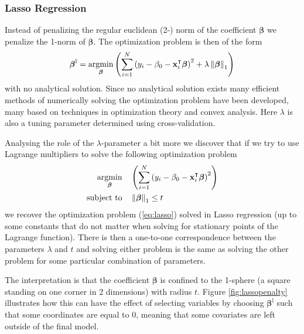 \documentclass[a4paper, 12pt]{scrartcl}
\newcommand{\bfbeta}{\boldsymbol{\beta}}
\newcommand{\bfx}{\mathbf{x}}
\begin{document}

\subsubsection*{Lasso Regression}
\begin{algorithm}
Instead of penalizing the regular euclidean (2-) norm of the coefficient $\bfbeta$ we penalize the 1-norm of $\bfbeta$.
The optimization problem is then of the form
\begin{equation}\label{eq:lasso}
	\bfbeta^\mathrm{l}=\operatornamewithlimits{argmin}_{\bfbeta}\left(\sum_{i=1}^{N}\left(y_i-\beta_0-\bfx_i^\intercal\bfbeta\right)^2+\lambda\left\|\bfbeta\right\|_1\right)
\end{equation}
with no analytical solution.
Since no analytical solution exists many efficient methods of numerically solving the optimization problem have been developed, many based on techniques in optimization theory and convex analysis.
Here $\lambda$ is also a tuning parameter determined using cross-validation.
\end{algorithm}

Analysing the role of the $\lambda$-parameter a bit more we discover that if we try to use Lagrange multipliers to solve the following optimization problem
\begin{equation*}
	\begin{aligned}
	\operatornamewithlimits{argmin}_{\bfbeta} & & &\left(\sum_{i=1}^{N}\left(y_i-\beta_0-\bfx_i^\intercal\bfbeta\right)^2\right)\\
	\text{subject to} & & & \left\|\bfbeta\right\|_1 \leq t
	\end{aligned}
\end{equation*}
we recover the optimization problem (\ref{eq:lasso}) solved in Lasso regression (up to some constants that do not matter when solving for stationary points of the Lagrange function).
There is then a one-to-one correspondence between the parameters $\lambda$ and $t$ and solving either problem is the same as solving the other problem for some particular combination of parameters.

The interpretation is that the coefficient $\bfbeta$ is confined to the 1-sphere (a square standing on one corner in 2 dimensions) with radius $t$.
Figure \ref{fig:lassopenalty} illustrates how this can have the effect of selecting variables by choosing $\bfbeta^\mathrm{l}$ such that some coordinates are equal to 0, meaning that some covariates are left outside of the final model.
\end{document}
